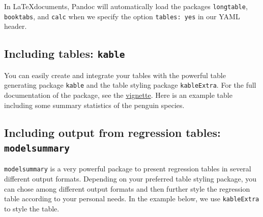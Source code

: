 \documentclass[
  11pt,
]{scrartcl}
\begin{document}
In \LaTeX documents, Pandoc will automatically load the packages \texttt{longtable}, \texttt{booktabs}, and \texttt{calc} when we specify the option \texttt{tables:\ yes} in our YAML header.

\hypertarget{including-tables-kable}{%
\subsection{\texorpdfstring{Including tables: \texttt{kable}}{Including tables: kable}}\label{including-tables-kable}}

You can easily create and integrate your tables with the powerful table generating package \texttt{kable} and the table styling package \texttt{kableExtra}. For the full documentation of the package, see the \href{https://haozhu233.github.io/kableExtra/awesome_table_in_pdf.pdf}{vignette}. Here is an example table including some summary statistics of the penguin species.

\begin{table}[!h]

\caption{\label{tab:kable-advanced}Differences in Flipper and Bill Length across Penguin Species}
\centering
{}
\end{table}

\hypertarget{including-output-from-regression-tables-modelsummary}{%
\subsection{\texorpdfstring{Including output from regression tables: \texttt{modelsummary}}{Including output from regression tables: modelsummary}}\label{including-output-from-regression-tables-modelsummary}}

\texttt{modelsummary} is a very powerful package to present regression tables in several different output formats. Depending on your preferred table styling package, you can chose among different output formats and then further style the regression table according to your personal needs. In the example below, we use \texttt{kableExtra} to style the table.
\end{document}
